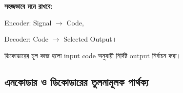 \par\begingroup


\textbf{সহজভাবে মনে রাখবে:}\quad

\textenglish{Encoder: Signal}
\(\rightarrow\)
\textenglish{Code},

\qquad

\textenglish{Decoder: Code}
\(\rightarrow\)
\textenglish{Selected Output}।

ডিকোডারের মূল কাজ হলো
\textenglish{input code} অনুযায়ী
নির্দিষ্ট \textenglish{output} নির্বাচন করা।

\par\endgroup



\subsection{এনকোডার ও ডিকোডারের তুলনামূলক পার্থক্য}

